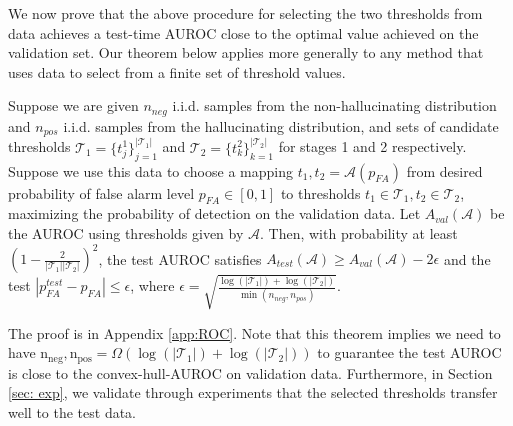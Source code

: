 We now prove that the above procedure for selecting the two thresholds from data achieves a test-time AUROC close to the optimal value achieved on the validation set. Our theorem below applies more generally to any method that uses data to select from a finite set of threshold values.
\begin{theorem}\label{thm:ROC}
Suppose we are given $n_{neg}$ i.i.d. samples from the non-hallucinating distribution and $n_{pos}$ i.i.d. samples from the hallucinating distribution, and  sets of candidate thresholds $\mathcal{T}_1 = \{t^1_j\}_{j=1}^{|\mathcal{T}_1|}$ and $\mathcal{T}_2 = \{t^2_k\}_{k=1}^{|\mathcal{T}_2|}$ for stages 1 and 2 respectively. Suppose we use this data to choose a mapping $t_1,t_2 = \mathcal{A}(p_{FA})$ from desired probability of false alarm level $p_{FA}\in [0,1]$ to thresholds $t_1 \in \mathcal{T}_1, t_2 \in \mathcal{T}_2$, maximizing the probability of detection on the validation data. Let $A_{val}(\mathcal{A})$ be the AUROC using thresholds given by $\mathcal{A}$. Then, with probability at least $\left(1 - \frac{2}{|\mathcal{T}_1| |\mathcal{T}_2|}\right)^2$, the test AUROC satisfies
$
A_{test}(\mathcal{A}) \geq A_{val}(\mathcal{A}) - 2\epsilon$
and the test $|p^{test}_{FA} - p_{FA}| \leq \epsilon$, where
$
\epsilon = \sqrt{\frac{\log(|\mathcal{T}_1|) + \log(|\mathcal{T}_2|)}{\min(n_{neg}, n_{pos})}}$.
\end{theorem}
\vspace{-.2cm}

The proof is in Appendix \ref{app:ROC}.
Note that this theorem implies we need to have $
\mathrm{n_{neg}}, \mathrm{n_{pos}} = \Omega\left(\log(|\mathcal{T}_1|) + \log(|\mathcal{T}_2|)\right)$ to guarantee the test AUROC is close to the convex-hull-AUROC on validation data. Furthermore, in Section \ref{sec: exp}, we validate through experiments that the selected thresholds transfer well to the test data.

